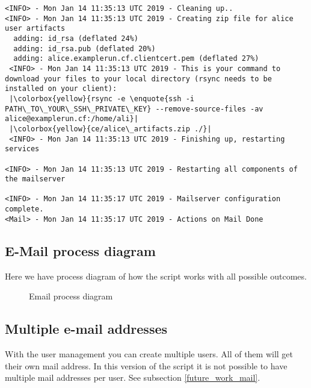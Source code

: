 \begin{lstlisting}[escapeinside=||]
<INFO> - Mon Jan 14 11:35:13 UTC 2019 - Cleaning up..
<INFO> - Mon Jan 14 11:35:13 UTC 2019 - Creating zip file for alice user artifacts
  adding: id_rsa (deflated 24%)
  adding: id_rsa.pub (deflated 20%)
  adding: alice.examplerun.cf.clientcert.pem (deflated 27%)
 <INFO> - Mon Jan 14 11:35:13 UTC 2019 - This is your command to download your files to your local directory (rsync needs to be installed on your client): 
 |\colorbox{yellow}{rsync -e \enquote{ssh -i PATH\_TO\_YOUR\_SSH\_PRIVATE\_KEY} --remove-source-files -av alice@examplerun.cf:/home/ali}|
 |\colorbox{yellow}{ce/alice\_artifacts.zip ./}|
 <INFO> - Mon Jan 14 11:35:13 UTC 2019 - Finishing up, restarting services

<INFO> - Mon Jan 14 11:35:13 UTC 2019 - Restarting all components of the mailserver

<INFO> - Mon Jan 14 11:35:17 UTC 2019 - Mailserver configuration complete.
<Mail> - Mon Jan 14 11:35:17 UTC 2019 - Actions on Mail Done
 \end{lstlisting}
 \newpage
 
\subsection{E-Mail process diagram}
Here we have process diagram of how the script works with all possible outcomes.

\begin{figure}[H]
        \usetikzlibrary{shapes,arrows,calc}
        \centering
        
        \caption{Email process diagram}
\end{figure}

\subsection{Multiple e-mail addresses}
With the user management you can create multiple users. All of them will get their own mail address. In this version of the script it is not possible to have multiple mail addresses per user. See subsection \ref{future_work_mail}.

\newpage
